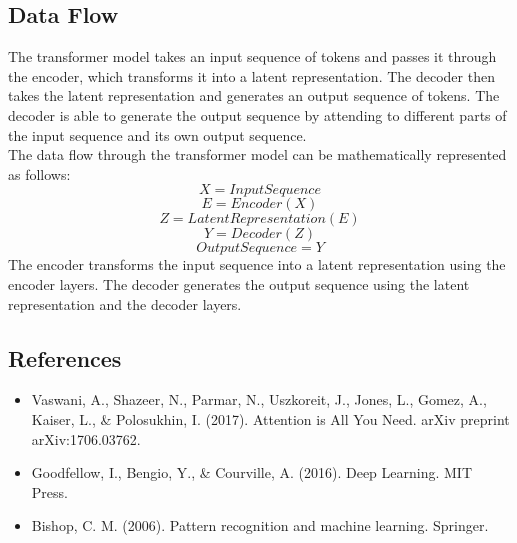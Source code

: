 \documentclass{article}
\begin{document}
\subsection{Data Flow}
The transformer model takes an input sequence of tokens and passes it through the encoder, which transforms it into a latent representation. The decoder then takes the latent representation and generates an output sequence of tokens. The decoder is able to generate the output sequence by attending to different parts of the input sequence and its own output sequence. \\

The data flow through the transformer model can be mathematically represented as follows: \\ 
\[ X = InputSequence \]
\[E = Encoder(X) \]
\[Z = LatentRepresentation(E) \]
\[Y = Decoder(Z) \]
\[OutputSequence = Y \]
The encoder transforms the input sequence into a latent representation using the encoder layers. The decoder generates the output sequence using the latent representation and the decoder layers.

\subsection{References}
\begin{itemize}
    \item Vaswani, A., Shazeer, N., Parmar, N., Uszkoreit, J., Jones, L., Gomez, A., Kaiser, L., & Polosukhin, I. (2017). Attention is All You Need. arXiv preprint arXiv:1706.03762.
    \item Goodfellow, I., Bengio, Y., & Courville, A. (2016). Deep Learning. MIT Press.
    \item Bishop, C. M. (2006). Pattern recognition and machine learning. Springer.

\end{itemize}
\end{document}
